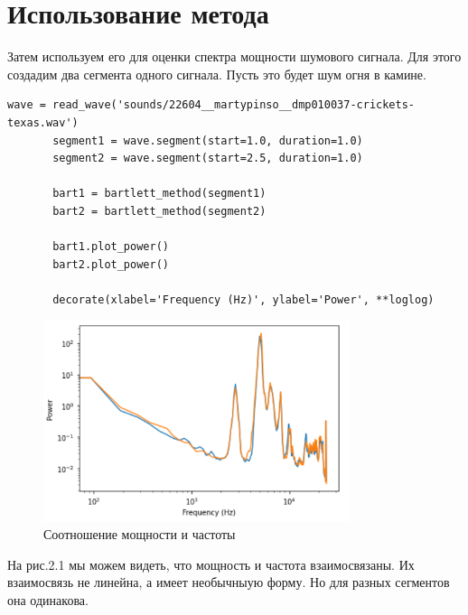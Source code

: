 \documentclass[a4paper,12pt]{report}
\begin{document}
\section{Использование метода}    
    Затем используем его для оценки спектра мощности шумового сигнала. Для этого создадим два сегмента одного сигнала. Пусть это будет шум огня в камине.
\begin{lstlisting}[caption=Использование метода]
       wave = read_wave('sounds/22604__martypinso__dmp010037-crickets-texas.wav')
       segment1 = wave.segment(start=1.0, duration=1.0)
       segment2 = wave.segment(start=2.5, duration=1.0)

       bart1 = bartlett_method(segment1)
       bart2 = bartlett_method(segment2)

       bart1.plot_power()
       bart2.plot_power()

       decorate(xlabel='Frequency (Hz)', ylabel='Power', **loglog)
\end{lstlisting} 
\begin{figure}[H]
        \centering
        \includegraphics[width=0.8\textwidth]{fig2-1.PNG}
        \caption{Соотношение мощности и частоты}
        \label{fig:fig2-1}
\end{figure}

    На рис.2.1 мы можем видеть, что мощность и частота взаимосвязаны. Их взаимосвязь не линейна, а имеет необычныую форму. Но для разных сегментов она одинакова.
\end{document}
